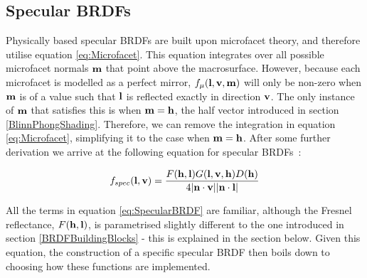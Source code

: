 \subsection{Specular BRDFs} \label{SpecularBRDFs}

Physically based specular BRDFs are built upon microfacet theory, and therefore utilise equation \ref{eq:Microfacet}. This equation integrates over all possible microfacet normals \begin{math}\mathbf{m}\end{math} that point above the macrosurface. However, because each microfacet is modelled as a perfect mirror, \begin{math}f_\mu(\mathbf{l}, \mathbf{v}, \mathbf{m})\end{math} will only be non-zero when \begin{math}\mathbf{m}\end{math} is of a value such that \begin{math}\mathbf{l}\end{math} is reflected exactly in direction \begin{math}\mathbf{v}\end{math}. The only instance of \begin{math}\mathbf{m}\end{math} that satisfies this is when \begin{math}\mathbf{m} = \mathbf{h}\end{math}, the half vector introduced in section \ref{BlinnPhongShading}. Therefore, we can remove the integration in equation \ref{eq:Microfacet}, simplifying it to the case when \begin{math}\mathbf{m} = \mathbf{h}\end{math}. After some further derivation we arrive at the following equation for specular BRDFs~\cite{HeitzMicrofacetTheory}:

\begin{equation} \label{eq:SpecularBRDF}
	f_{spec}(\mathbf{l}, \mathbf{v}) = \frac{F(\mathbf{h}, \mathbf{l})G(\mathbf{l}, \mathbf{v}, \mathbf{h})D(\mathbf{h})}{4\abs{\mathbf{n}\cdot\mathbf{v}}\abs{\mathbf{n}\cdot\mathbf{l}}}
\end{equation}

All the terms in equation \ref{eq:SpecularBRDF} are familiar, although the Fresnel reflectance, \begin{math}F(\mathbf{h}, \mathbf{l})\end{math}, is parametrised slightly different to the one introduced in section \ref{BRDFBuildingBlocks} - this is explained in the section below. Given this equation, the construction of a specific specular BRDF then boils down to choosing how these functions are implemented.

